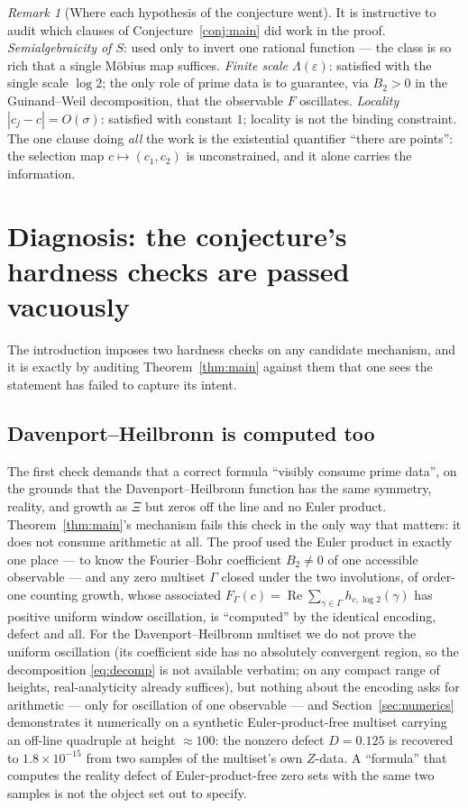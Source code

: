 \documentclass[11pt]{amsart}
\theoremstyle{definition}
\theoremstyle{remark}
\newtheorem{remark}[theorem]{Remark}
\DeclareMathOperator{\Rre}{Re}
\begin{document}
\begin{remark}[Where each hypothesis of the conjecture went]\label{rem:audit}
It is instructive to audit which clauses of Conjecture~\ref{conj:main} did work in the proof. \emph{Semialgebraicity of $S$}: used only to invert one rational function --- the class is so rich that a single Möbius map suffices. \emph{Finite scale $\Lambda(\varepsilon)$}: satisfied with the single scale $\log2$; the only role of prime data is to guarantee, via $B_2>0$ in the Guinand--Weil decomposition, that the observable $F$ oscillates. \emph{Locality $|c_j-c|=O(\sigma)$}: satisfied with constant $1$; locality is not the binding constraint. The one clause doing \emph{all} the work is the existential quantifier ``there are points'': the selection map $c\mapsto(c_1,c_2)$ is unconstrained, and it alone carries the information.
\end{remark}

\section{Diagnosis: the conjecture's hardness checks are passed vacuously}\label{sec:diagnosis}

The introduction \cite[\S2]{SI} imposes two hardness checks on any candidate mechanism, and it is exactly by auditing Theorem~\ref{thm:main} against them that one sees the statement has failed to capture its intent.

\subsection{Davenport--Heilbronn is computed too}
The first check demands that a correct formula ``visibly consume prime data'', on the grounds that the Davenport--Heilbronn function has the same symmetry, reality, and growth as $\Xi$ but zeros off the line and no Euler product. Theorem~\ref{thm:main}'s mechanism fails this check in the only way that matters: it does not consume arithmetic at all. The proof used the Euler product in exactly one place --- to know the Fourier--Bohr coefficient $B_2\neq0$ of one accessible observable --- and any zero multiset $\Gamma$ closed under the two involutions, of order-one counting growth, whose associated $F_\Gamma(c)=\Rre\sum_{\gamma\in\Gamma}h_{c,\log2}(\gamma)$ has positive uniform window oscillation, is ``computed'' by the identical encoding, defect and all. For the Davenport--Heilbronn multiset we do not prove the uniform oscillation (its coefficient side has no absolutely convergent region, so the decomposition \eqref{eq:decomp} is not available verbatim; on any compact range of heights, real-analyticity already suffices), but nothing about the encoding asks for arithmetic --- only for oscillation of one observable --- and Section~\ref{sec:numerics} demonstrates it numerically on a synthetic Euler-product-free multiset carrying an off-line quadruple at height $\approx100$: the nonzero defect $D=0.125$ is recovered to $1.8\times10^{-15}$ from two samples of the multiset's own $Z$-data. A ``formula'' that computes the reality defect of Euler-product-free zero sets with the same two samples is not the object \cite{SI} set out to specify.
\end{document}
